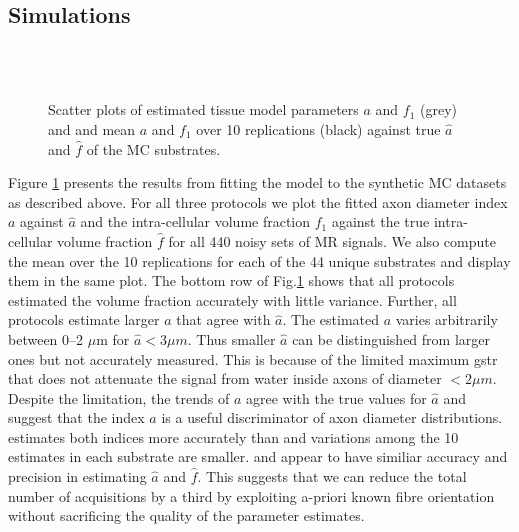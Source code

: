 \subsection{Simulations}
\begin{figure}
\centering
		\\
		\\
		 
  \caption{Scatter plots of estimated tissue model parameters $a$ and $f_1$ (grey) and and mean $a$ and $f_1$ over 10 replications (black) against true $\hat{a}$ and $\hat{f}$ of the MC substrates.}
  \label{fig:experiment4:mc simulations}
\end{figure}
Figure \ref{fig:experiment4:mc simulations} presents the results from fitting the model to the synthetic MC datasets as described above. For all three protocols we plot the fitted axon diameter index $a$ against $\hat{a}$ and the intra-cellular volume fraction $f_1$ against the true intra-cellular volume fraction $\hat{f}$ for all 440 noisy sets of MR signals. We also compute the mean over the 10 replications for each of the 44 unique substrates and display them in the same plot. The bottom row of Fig.\ref{fig:experiment4:mc simulations} shows that all protocols estimated the volume fraction accurately with little variance. Further, all protocols estimate larger $a$ that agree with $\hat{a}$. The estimated $a$ varies arbitrarily between 0--2 $\mu$m for $\hat{a} < 3\mu m$. Thus smaller $\hat{a}$ can be distinguished from larger ones but not accurately measured. This is because of the limited maximum {\gls{gstr}} that does not attenuate the signal from water inside axons of diameter $<2\mu m$. Despite the limitation, the trends of $a$ agree with the true
values for $\hat{a}$ and suggest that the index $a$ is a useful discriminator of axon diameter distributions. \SFlong{} estimates both indices more accurately than \OIlong{} and variations among the 10 estimates in each substrate are smaller. \SFshort{} and \OIlong{} appear to have similiar accuracy and precision in estimating $\hat{a}$ and $\hat{f}$. This suggests that we can reduce the total number of acquisitions by a third by exploiting a-priori known fibre orientation without sacrificing the quality of the parameter estimates.

